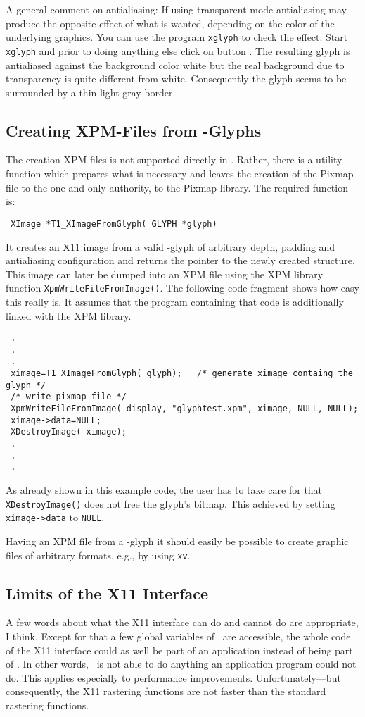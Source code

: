 A general comment on antialiasing: If using transparent mode antialiasing
may produce the opposite effect of what is wanted, depending on the color of
the underlying graphics. You can use the program \verb+xglyph+ to check the
effect: Start \verb+xglyph+ and prior to doing anything else click on button
. The resulting glyph is antialiased against the background
color white but the real background due to transparency is quite different
from white. Consequently the glyph seems to be surrounded by a thin light gray
border.


\subsection{Creating XPM-Files from \tonelib-Glyphs}
\label{xpmfiles}
The creation XPM files is not supported directly in \tonelib. Rather, there is
a utility function which prepares what is necessary and leaves the creation of
the Pixmap file to the one and only authority, to the Pixmap library. The
required function is:
\precorr
\begin{verbatim}
 XImage *T1_XImageFromGlyph( GLYPH *glyph)
\end{verbatim}\postcorr
It creates an X11 image from a valid \tonelib-glyph of arbitrary depth,
padding and antialiasing configuration and returns the pointer to the newly
created structure. This image can later be dumped into an XPM file using the
XPM library function \verb+XpmWriteFileFromImage()+. The following code
fragment shows how easy this really is. It assumes that the program containing
that code is additionally linked with the XPM library.
\begin{verbatim}
 .
 .
 .
 ximage=T1_XImageFromGlyph( glyph);   /* generate ximage containg the glyph */
 /* write pixmap file */
 XpmWriteFileFromImage( display, "glyphtest.xpm", ximage, NULL, NULL); 
 ximage->data=NULL;
 XDestroyImage( ximage);
 .
 .
 .
\end{verbatim}
As already shown in this example code, the user has to take care for that
\verb+XDestroyImage()+ does not free the glyph's bitmap. This achieved by
setting \verb+ximage->data+ to \verb+NULL+.

Having an XPM file from a \tonelib-glyph it should easily be possible to
create graphic files of arbitrary formats, e.g., by using \verb+xv+.

\subsection{Limits of the X11 Interface}
A few words about what the X11 interface can do and cannot do are appropriate,
I think. Except for that a few global variables of \tonelib\ are accessible,
the whole code of the X11 interface could as well be part of an application
instead of being part of \tonelib. In other words, \tonelib\ is not able to do
anything an application program could not do. This applies especially to
performance improvements. Unfortunately---but consequently, the X11 rastering
functions are not faster than the standard rastering functions.

